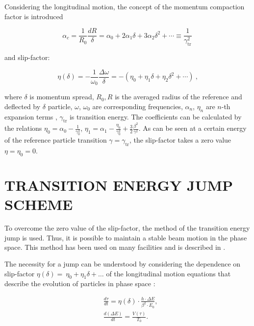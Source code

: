\documentclass[
aps,%
12pt,%
final,%
notitlepage,%
oneside,%
onecolumn,%
nobibnotes,%
nofootinbib,%
superscriptaddress,%
noshowpacs,%
centertags]%
{revtex4}
\begin{document}
\par Considering the longitudinal motion, the concept of the momentum compaction factor is introduced \cite{lee}

\begin{equation}
\alpha_c=\frac{1}{R_0}\frac{dR}{\delta}=\alpha_0+2\alpha_1\delta+3\alpha_2\delta^2+\cdots\equiv\frac{1}{\gamma_{\text{tr}}^2}\ 
\label{eq:mcf}
\end{equation}

and slip-factor:

\begin{equation}
\eta\left(\delta\right)=-\frac{1}{\omega_0}\frac{\Delta\omega}{\delta}=-\left(\eta_0+\eta_1\delta+\eta_2\delta^2+\cdots\right)\ ,
\label{eq:slipfactor}
\end{equation}

\par where $\delta$ is momentum spread, $R_{0}, R$ is the averaged radius of the reference and deflected by $\delta$ particle, $\omega$, $\omega_{0}$ are corresponding frequencies, $\alpha_{n}$, $\eta_{n}$ are $n$-th expansion terms , $\gamma_{\text{tr}}$ is transition energy. The coefficients can be calculated by the relations $\eta_0=\alpha_0-\frac{1}{\gamma_0^2}$, $\eta_1=\alpha_1-\frac{\eta_0}{\gamma_0^2}+\frac{3}{2}\frac{\beta^2}{\gamma^2}$. As can be seen at a certain energy of the reference particle transition $\gamma=\gamma_{\text{tr}}$, the slip-factor takes a zero value $\eta=\eta_{0}=0$.

\section{TRANSITION ENERGY JUMP SCHEME}

\par To overcome the zero value of the slip-factor, the method of the transition energy jump is used. Thus, it is possible to maintain a stable beam motion in the phase space. This method has been used on many facilities and is described in \cite{jump_scheme, pip}.

\par The necessity for a jump can be understood by considering the dependence on slip-factor $\eta\left(\delta\right)=\ \eta_0+\eta_1\delta+\ldots$ of the longitudinal motion equations that describe the evolution of particles in phase space \cite{Hans}:

\begin{equation}
\begin{aligned}
&\frac{d\tau}{dt}=\eta(\delta)\cdot\frac{h\cdot\Delta E}{\beta^2\cdot E_0},\\
&\frac{d\left(\Delta E\right)}{dt}=\frac{V\left(\tau\right)}{T_0}.
\end{aligned}
\label{eq:long}
\end{equation}
\end{document}
